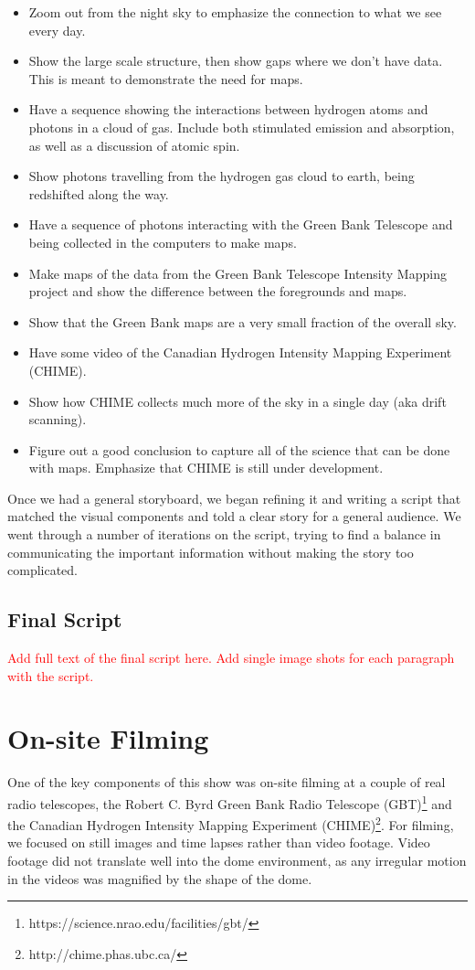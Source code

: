 \begin{itemize}
\item Zoom out from the night sky to emphasize the connection to what we see every day.
\item Show the large scale structure, then show gaps where we don't have data. This is meant to demonstrate the need for \cm maps.
\item Have a sequence showing the interactions between hydrogen atoms and \cm photons in a cloud of gas. Include both stimulated emission and absorption, as well as a discussion of atomic spin.
\item Show photons travelling from the hydrogen gas cloud to earth, being redshifted along the way. 
\item Have a sequence of photons interacting with the Green Bank Telescope and being collected in the computers to make maps.
\item Make maps of the data from the Green Bank Telescope Intensity Mapping project and show the difference between the foregrounds and \cm maps. 
\item Show that the Green Bank maps are a very small fraction of the overall sky.
\item Have some video of the Canadian Hydrogen Intensity Mapping Experiment (CHIME).
\item Show how CHIME collects much more of the sky in a single day (aka drift scanning). 
\item Figure out a good conclusion to capture all of the science that can be done with \cm maps. Emphasize that CHIME is still under development. 
\end{itemize}

Once we had a general storyboard, we began refining it and writing a script that matched the visual components and told a clear story for a general audience. We went through a number of iterations on the script, trying to find a balance in communicating the important information without making the story too complicated. 

\subsection{Final Script}

\textcolor{red}{Add full text of the final script here.}
\textcolor{red}{Add single image shots for each paragraph with the script.}


\section{On-site Filming}
One of the key components of this show was on-site filming at a couple of real radio telescopes, the Robert C. Byrd Green Bank Radio Telescope (GBT)\footnote{https://science.nrao.edu/facilities/gbt/} and the Canadian Hydrogen Intensity Mapping Experiment (CHIME)\footnote{http://chime.phas.ubc.ca/}. For filming, we focused on still images and time lapses rather than video footage. Video footage did not translate well into the dome environment, as any irregular motion in the videos was magnified by the shape of the dome.  

